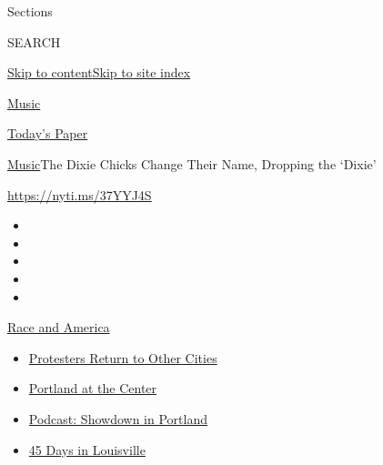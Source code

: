 Sections

SEARCH

\protect\hyperlink{site-content}{Skip to
content}\protect\hyperlink{site-index}{Skip to site index}

\href{https://www.nytimes3xbfgragh.onion/section/arts/music}{Music}

\href{https://myaccount.nytimes3xbfgragh.onion/auth/login?response_type=cookie\&client_id=vi}{}

\href{https://www.nytimes3xbfgragh.onion/section/todayspaper}{Today's
Paper}

\href{/section/arts/music}{Music}\textbar{}The Dixie Chicks Change Their
Name, Dropping the `Dixie'

\href{https://nyti.ms/37YYJ4S}{https://nyti.ms/37YYJ4S}

\begin{itemize}
\item
\item
\item
\item
\item
\end{itemize}

\href{https://www.nytimes3xbfgragh.onion/news-event/george-floyd-protests-minneapolis-new-york-los-angeles?action=click\&pgtype=Article\&state=default\&region=TOP_BANNER\&context=storylines_menu}{Race
and America}

\begin{itemize}
\tightlist
\item
  \href{https://www.nytimes3xbfgragh.onion/2020/07/26/us/protests-portland-seattle-trump.html?action=click\&pgtype=Article\&state=default\&region=TOP_BANNER\&context=storylines_menu}{Protesters
  Return to Other Cities}
\item
  \href{https://www.nytimes3xbfgragh.onion/2020/07/24/us/portland-oregon-protests-white-race.html?action=click\&pgtype=Article\&state=default\&region=TOP_BANNER\&context=storylines_menu}{Portland
  at the Center}
\item
  \href{https://www.nytimes3xbfgragh.onion/2020/07/23/podcasts/the-daily/portland-protests.html?action=click\&pgtype=Article\&state=default\&region=TOP_BANNER\&context=storylines_menu}{Podcast:
  Showdown in Portland}
\item
  \href{https://www.nytimes3xbfgragh.onion/interactive/2020/07/16/us/black-lives-matter-protests-louisville-breonna-taylor.html?action=click\&pgtype=Article\&state=default\&region=TOP_BANNER\&context=storylines_menu}{45
  Days in Louisville}
\end{itemize}

